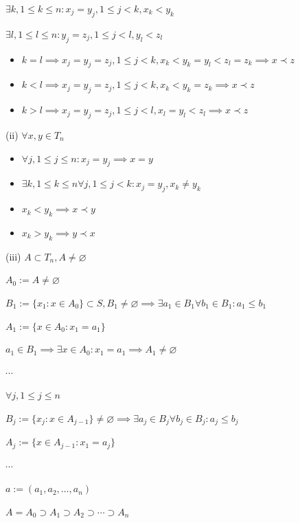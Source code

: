 \documentclass{article}
\begin{document}
\( \exists k, 1 \leq k \leq n: x_{j} = y_{j}, 1 \leq j < k, x_{k} < y_{k} \)

\( \exists l, 1 \leq l \leq n: y_{j} = z_{j}, 1 \leq j < l, y_{l} < z_{l} \)

\begin{itemize}
\item \( k = l \implies x_{j} = y_{j} = z_{j}, 1 \leq j < k, x_{k} < y_{k} = y_{l} < z_{l} = z_{k} \implies x \prec z \)
\item \( k < l \implies x_{j}=y_{j}=z_{j}, 1 \leq j < k, x_{k} < y_{k} = z_{k} \implies x \prec z \)
\item \( k > l \implies x_{j} = y_{j} = z_{j}, 1 \leq j < l, x_{l}=y_{l} < z_{l} \implies x \prec z \)
\end{itemize}

(ii) \( \forall x, y \in T_{n} \)

\begin{itemize}
\item \( \forall j, 1 \leq j \leq n: x_{j}=y_{j} \implies x=y \)
\item \( \exists k, 1 \leq k \leq n \forall j, 1 \leq j < k: x_{j} = y_{j}, x_{k} \neq y_{k} \)
\item \( x_{k} < y_{k} \implies x \prec y \)
\item \( x_{k} > y_{k} \implies y \prec x \)
\end{itemize}

(iii) \( A \subset T_{n}, A \neq \varnothing \)

\( A_{0} := A \neq \varnothing \)

\( B_{1} := \{ x_{1}: x \in A_{0} \} \subset S, B_{1} \neq \varnothing \implies \exists a_{1} \in B_{1} \forall b_{1} \in B_{1}: a_{1} \leq b_{1} \)

\( A_{1} := \{ x \in A_{0}: x_{1} = a_{1} \} \)

\( a_{1} \in B_{1} \implies \exists x \in A_{0}: x_{1} = a_{1} \implies A_{1} \neq \varnothing \)

\( \cdots \)

\( \forall j, 1 \leq j \leq n \)

\( B_{j} := \{ x_{j}: x \in A_{j-1} \} \neq \varnothing \implies \exists a_{j} \in B_{j} \forall b_{j} \in B_{j}: a_{j} \leq b_{j} \)

\( A_{j} := \{ x \in A_{j-1}: x_{1} = a_{j} \} \)

\( \cdots \)

\( a := (a_{1}, a_{2}, \ldots, a_{n}) \)

\( A=A_{0} \supset A_{1} \supset A_{2} \supset \cdots \supset A_{n} \)
\end{document}
